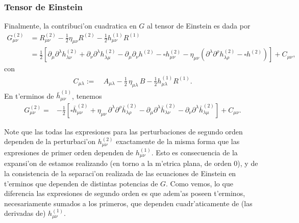 \subsubsection{Tensor de Einstein}
Finalmente, la contribuci'on cuadratica en $G$ al tensor de Einstein es dada por
\begin{align}
G^{(2)}_{\mu\nu} & =  R^{(2)}_{\mu\nu}-\frac{1}{2}\eta_{\mu\nu}R^{(2)}-\frac{1}{2}h^{(1)}_{\mu\nu}R^{(1)}\\
& =  \frac{1}{2}\left[\partial_\mu\partial^\lambda h^{(2)}_{\lambda\nu}
+\partial_\nu\partial^\lambda h^{(2)}_{\lambda\mu} -
\partial_\mu\partial_\nu h^{(2)} -\square h^{(2)}_{\mu\nu}
-\eta_{\mu\nu}\left(\partial^\lambda \partial^\rho h^{(2)}_{\lambda\rho}
- \square h^{(2)}\right) \right]+C_{\mu\nu},
\end{align}
con
\begin{align}
C_{\mu\lambda} :=&\  A_{\mu\lambda}-\frac{1}{2}\,\eta_{\mu\lambda}\, B-\frac{1}{2}h^{(1)}_{\mu\lambda}R^{(1)}.
\end{align}
En t'erminos de $\bar{h}^{(1)}_{\mu\nu}$, tenemos
\begin{align}
G^{(2)}_{\mu\nu} = & -\frac{1}{2}\left[\square \bar{h}^{(2)}_{\mu\nu}
+\eta_{\mu\nu}\, \partial^\lambda\partial^\rho\bar{h}^{(2)}_{\lambda\rho}-
\partial_\mu\partial^\lambda\bar{h}^{(2)}_{\lambda\nu}
- \partial_\nu\partial^\lambda \bar{h}^{(2)}_{\lambda\mu}\right]
+C_{\mu\nu}.
\end{align}

Note que las todas las expresiones para las perturbaciones de segundo orden dependen de la perturbaci'on $h^{(2)}_{\mu\nu}$ exactamente de la misma forma que las expresiones de primer orden dependen de $h^{(1)}_{\mu\nu}$. Esto es consecuencia de la expansi'on de estamos realizando (en torno a la m'etrica plana, de orden 0), y de la consistencia de la separaci'on realizada de las ecuaciones de Einstein en t'erminos que dependen de distintas potencias de $G$. Como vemos, lo que diferencia las expresiones de segundo orden es que adem'as poseen t'erminos, necesariamente sumados a los primeros, que dependen cuadr'aticamente de (las derivadas de) $h^{(1)}_{\mu\nu}$.


